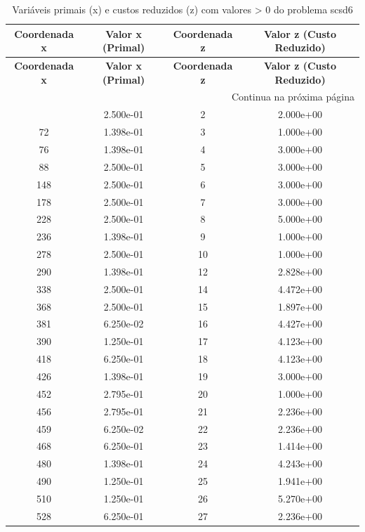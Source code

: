 \documentclass[12pt]{article}
\begin{document}
\begin{longtable}{@{}cccc@{}}
\caption{Variáveis primais (x) e custos reduzidos (z) com valores > 0 do problema scsd6} \\
\toprule
\textbf{Coordenada x} & \textbf{Valor x (Primal)} & \textbf{Coordenada z} & \textbf{Valor z (Custo Reduzido)} \\
\midrule
\endfirsthead

\toprule
\textbf{Coordenada x} & \textbf{Valor x (Primal)} & \textbf{Coordenada z} & \textbf{Valor z (Custo Reduzido)} \\
\midrule
\endhead

\midrule \multicolumn{4}{r}{{Continua na próxima página}} \\ \midrule
\endfoot

\bottomrule
\endlastfoot
38 & 2.500e-01 & 2 & 2.000e+00 \\
72 & 1.398e-01 & 3 & 1.000e+00 \\
76 & 1.398e-01 & 4 & 3.000e+00 \\
88 & 2.500e-01 & 5 & 3.000e+00 \\
148 & 2.500e-01 & 6 & 3.000e+00 \\
178 & 2.500e-01 & 7 & 3.000e+00 \\
228 & 2.500e-01 & 8 & 5.000e+00 \\
236 & 1.398e-01 & 9 & 1.000e+00 \\
278 & 2.500e-01 & 10 & 1.000e+00 \\
290 & 1.398e-01 & 12 & 2.828e+00 \\
338 & 2.500e-01 & 14 & 4.472e+00 \\
368 & 2.500e-01 & 15 & 1.897e+00 \\
381 & 6.250e-02 & 16 & 4.427e+00 \\
390 & 1.250e-01 & 17 & 4.123e+00 \\
418 & 6.250e-01 & 18 & 4.123e+00 \\
426 & 1.398e-01 & 19 & 3.000e+00 \\
452 & 2.795e-01 & 20 & 1.000e+00 \\
456 & 2.795e-01 & 21 & 2.236e+00 \\
459 & 6.250e-02 & 22 & 2.236e+00 \\
468 & 6.250e-01 & 23 & 1.414e+00 \\
480 & 1.398e-01 & 24 & 4.243e+00 \\
490 & 1.250e-01 & 25 & 1.941e+00 \\
510 & 1.250e-01 & 26 & 5.270e+00 \\
528 & 6.250e-01 & 27 & 2.236e+00 \\

\end{longtable}
\end{document}
